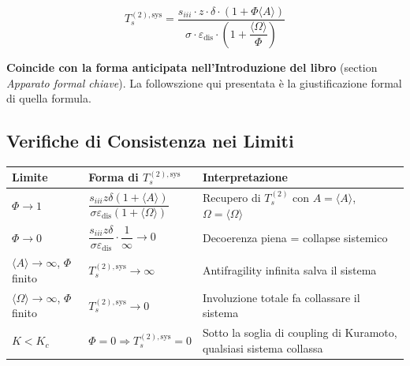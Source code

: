 \[
\boxed{T_s^{(2),\text{sys}} = \frac{s_{iii} \cdot z \cdot \delta \cdot \left(1 + \Phi \langle A \rangle\right)}{\sigma \cdot \varepsilon_{\text{dis}} \cdot \left(1 + \dfrac{\langle \Omega \rangle}{\Phi}\right)}}
\]

\Proved{} \textbf{Coincide con la forma anticipata nell'Introduzione del
libro} (section \emph{Apparato formal chiave}). La followszione qui
presentata è la giustificazione formal di quella formula.

\subsection{Verifiche di Consistenza nei
Limiti}\label{verifiche-di-consistenza-nei-limiti}

{\def\LTcaptype{none} %
{\small\begin{longtable}[]{@{}
  >{\raggedright\arraybackslash}p{}
  >{\raggedright\arraybackslash}p{}
  >{\raggedright\arraybackslash}p{}@{}}
\toprule\noalign{}
\begin{minipage}[b]{\linewidth}\raggedright
Limite
\end{minipage} & \begin{minipage}[b]{\linewidth}\raggedright
Forma di \(T_s^{(2),\text{sys}}\)
\end{minipage} & \begin{minipage}[b]{\linewidth}\raggedright
Interpretazione
\end{minipage} \\
\midrule\noalign{}
\endhead
\bottomrule\noalign{}
\endlastfoot
\(\Phi \to 1\) &
\(\dfrac{s_{iii} z \delta (1+\langle A\rangle)}{\sigma \varepsilon_{\text{dis}} (1+\langle\Omega\rangle)}\)
& Recupero di \(T_s^{(2)}\) con \(A = \langle A\rangle\),
\(\Omega = \langle\Omega\rangle\) \Proved{} \\
\(\Phi \to 0\) &
\(\dfrac{s_{iii} z \delta}{\sigma \varepsilon_{\text{dis}}} \cdot \dfrac{1}{\infty} \to 0\)
& Decoerenza piena = collapse sistemico \Proved{} \\
\(\langle A\rangle \to \infty\), \(\Phi\) finito &
\(T_s^{(2),\text{sys}} \to \infty\) & Antifragility infinita salva il
sistema \Proved{} \\
\(\langle\Omega\rangle \to \infty\), \(\Phi\) finito &
\(T_s^{(2),\text{sys}} \to 0\) & Involuzione totale fa collassare il
sistema \Proved{} \\
\(K < K_c\) & \(\Phi = 0 \Rightarrow T_s^{(2),\text{sys}} = 0\) & Sotto
la soglia di coupling di Kuramoto, qualsiasi sistema collassa
\Proved{} \\
\end{longtable}}
}


